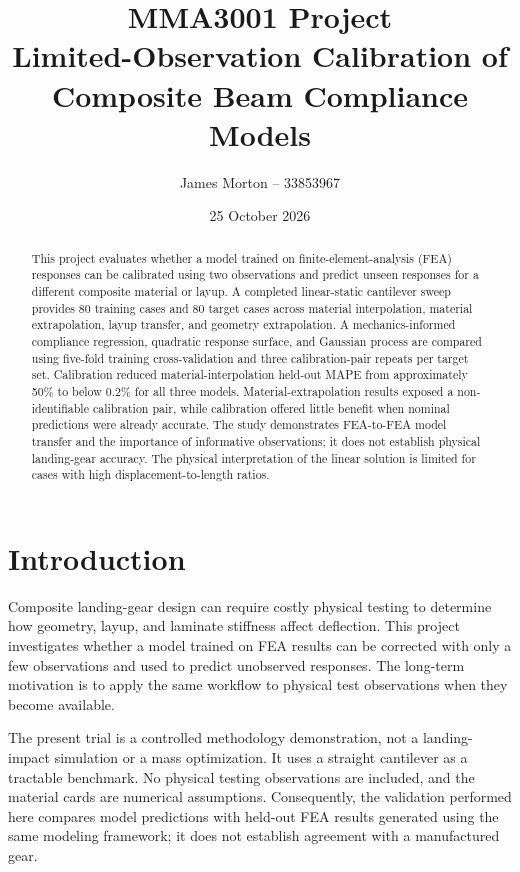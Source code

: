 \documentclass[11pt]{article}
\title{MMA3001 Project\\\large Limited-Observation Calibration of Composite Beam Compliance Models}
\author{James Morton -- 33853967}
\date{25 October 2026}
\begin{document}
\maketitle

\begin{abstract}
This project evaluates whether a model trained on finite-element-analysis (FEA) responses can be calibrated using two observations and predict unseen responses for a different composite material or layup. A completed linear-static cantilever sweep provides 80 training cases and 80 target cases across material interpolation, material extrapolation, layup transfer, and geometry extrapolation. A mechanics-informed compliance regression, quadratic response surface, and Gaussian process are compared using five-fold training cross-validation and three calibration-pair repeats per target set. Calibration reduced material-interpolation held-out MAPE from approximately 50\% to below 0.2\% for all three models. Material-extrapolation results exposed a non-identifiable calibration pair, while calibration offered little benefit when nominal predictions were already accurate. The study demonstrates FEA-to-FEA model transfer and the importance of informative observations; it does not establish physical landing-gear accuracy. The physical interpretation of the linear solution is limited for cases with high displacement-to-length ratios.
\end{abstract}

\section{Introduction}
Composite landing-gear design can require costly physical testing to determine how geometry, layup, and laminate stiffness affect deflection. This project investigates whether a model trained on FEA results can be corrected with only a few observations and used to predict unobserved responses. The long-term motivation is to apply the same workflow to physical test observations when they become available.

The present trial is a controlled methodology demonstration, not a landing-impact simulation or a mass optimization. It uses a straight cantilever as a tractable benchmark. No physical testing observations are included, and the material cards are numerical assumptions. Consequently, the validation performed here compares model predictions with held-out FEA results generated using the same modeling framework; it does not establish agreement with a manufactured gear.
\end{document}
